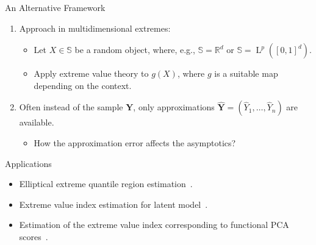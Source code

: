 \documentclass[11pt, aspectratio=169]{beamer}
\DeclareMathOperator{\lp}{L}
\begin{document}
\begin{frame}{An Alternative Framework}
  \begin{enumerate}
    \item Approach in multidimensional extremes:
    \begin{itemize}
      \item Let $X\in \mathbb{S}$ be a random object, where, e.g., $\mathbb{S} =
      \mathbb{R}^d$ or $\mathbb{S} = \lp^p([0,1]^d)$.
      \pause
      \item Apply extreme value theory to $g(X)$, where $g$ is a suitable map depending on the context.
    \end{itemize}
    \pause
    \item Often instead of the sample $\bm Y$, only approximations $\hat{\bm Y}
    = (\hat Y_1, \ldots, \hat Y_n)$ are available.
    \pause
    \begin{itemize}
      \item How the approximation error affects the asymptotics?
    \end{itemize}
  \end{enumerate}
\end{frame}


\begin{frame}{Applications}
  \begin{itemize}
    \item Elliptical extreme quantile region estimation~\parencite{pere2024}.
    \item Extreme value index estimation for latent model~\parencite{virta2024}.
    \item Estimation of the extreme value index corresponding to functional PCA
    scores~\parencite{kim2019}.
  \end{itemize}
\end{frame}

\end{document}
